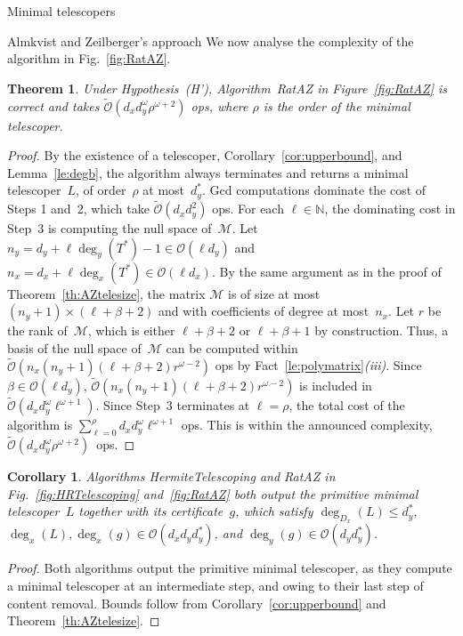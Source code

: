 \documentclass{sig-alt-full}
\newcommand{\bigO}{{\mathcal{O}}}
\newcommand{\bigOsoft}{\tilde{\mathcal{O}}}
\newcommand{\bN}{\mathbb{N}}
\newcommand{\cM}{\mathcal M}
\newtheorem{theorem}[lemma]{Theorem}
\newtheorem{cor}[lemma]{Corollary}
\begin{document}
\begin{section}{Minimal telescopers}
\begin{subsection}{Almkvist and Zeilberger's approach}
We now analyse the complexity of the algorithm in
Fig.~\ref{fig:RatAZ}.

\begin{theorem}
Under Hypothesis~(H'),
Algorithm~\textsf{RatAZ} in Figure~\ref{fig:RatAZ} is correct and takes
$\bigOsoft(d_xd_y^{\omega}\rho^{\omega+2})$ ops, where $\rho$ is the
order of the minimal telescoper.
\end{theorem}
\begin{proof}
By the existence of a telescoper, Corollary~\ref{cor:upperbound}, and
Lemma~\ref{le:degb}, the algorithm
always terminates and returns a minimal telescoper~$L$,
of order~$\rho$ at most~$d_y^*$.
Gcd computations dominate the cost of Steps 1 and~2, which
take $\bigOsoft(d_xd_y^2)$ ops.
For each $\ell \in \bN$, the dominating cost in Step~3 is
computing the null space of~$\cM$.
Let $n_y = d_y + \ell \deg_y(T^*)-1\in \bigO(\ell d_y)$ and $n_x=
d_x + \ell \deg_x(T^*)\in \bigO(\ell d_x)$. By the same argument as
in the proof of Theorem~\ref{th:AZtelesize}, the matrix $\cM$ is of
size at most $(n_y+1)\times (\ell + \beta + 2)$ and with coefficients of
degree at most~$n_x$.
Let $r$ be the rank of~$\cM$, which is either $\ell+\beta+2$ or
$\ell+\beta+1$ by construction.
Thus, a basis of the null space of~$\cM$ can
be computed within $\bigOsoft(n_x(n_y+1)(\ell+\beta+2)r^{\omega-2})$ ops
by Fact~\ref{le:polymatrix}\emph{(iii)}. Since $\beta\in \bigO(\ell
d_y)$, $\bigOsoft(n_x (n_y+1)(\ell+\beta+2)r^{\omega-2})$ is included in
$\bigOsoft(d_xd_y^{\omega}{\ell}^{\omega+1})$.
Since Step~3
terminates at $\ell=\rho$, the total cost of the algorithm is
$\sum_{\ell=0}^{\rho} d_xd_y^{\omega}{\ell}^{\omega+1}$ ops.
This is within the announced complexity,
$\bigOsoft(d_xd_y^{\omega}\rho^{\omega+2})$~ops.
\end{proof}

\begin{cor}
Algorithms \textsf{HermiteTelescoping} and \textsf{RatAZ} in
Fig.\ \ref{fig:HRTelescoping} and~\ref{fig:RatAZ} both output the
primitive minimal telescoper~$L$ together with its certificate~$g$,
which satisfy $\deg_{D_x}(L)\leq d_y^*$,
\ $\deg_x(L),\deg_x(g)\in\bigO(d_xd_yd_y^*)$, and
$\deg_y(g)\in\bigO(d_yd_y^*)$.
\end{cor}

\begin{proof}
Both algorithms output the primitive minimal telescoper, as they
compute a minimal telescoper at an intermediate step, and
owing to their last step of content removal.
Bounds follow from Corollary~\ref{cor:upperbound} and
Theorem~\ref{th:AZtelesize}.
\end{proof}

\end{subsection}

\end{section}
\end{document}
